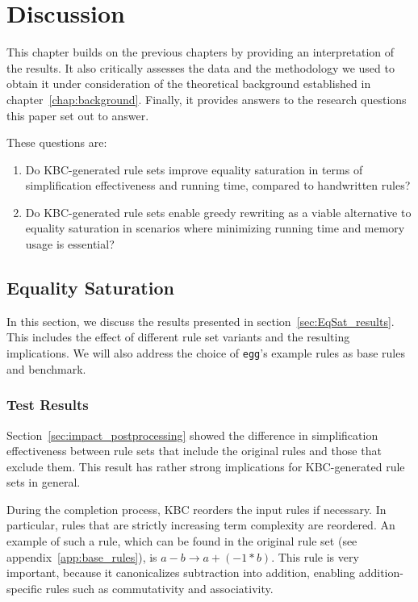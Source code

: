 \chapter{Discussion}
\label{chap:discussion}
This chapter builds on the previous chapters by providing an interpretation of the results. It also critically assesses the data and the methodology we used to obtain it under consideration of the theoretical background established in chapter~\ref{chap:background}. Finally, it provides answers to the research questions this paper set out to answer.

These questions are:
\begin{enumerate}
	\item Do KBC-generated rule sets improve equality saturation in terms of simplification effectiveness and running time, compared to handwritten rules?
	\item Do KBC-generated rule sets enable greedy rewriting as a viable alternative to equality saturation in scenarios where minimizing running time and memory usage is essential?
\end{enumerate}

\section{Equality Saturation}
In this section, we discuss the results presented in section~\ref{sec:EqSat_results}. This includes the effect of different rule set variants and the resulting implications. We will also address the choice of \texttt{egg}'s example rules as base rules and benchmark.

\subsection{Test Results}
Section~\ref{sec:impact_postprocessing} showed the difference in simplification effectiveness between rule sets that include the original rules and those that exclude them. This result has rather strong implications for KBC-generated rule sets in general. 

During the completion process, KBC reorders the input rules if necessary. In particular, rules that are strictly increasing term complexity are reordered. An example of such a rule, which can be found in the original rule set (see appendix~\ref{app:base_rules}), is $a - b \to a + (-1 * b)$. This rule is very important, because it canonicalizes subtraction into addition, enabling addition-specific rules such as commutativity and associativity.

